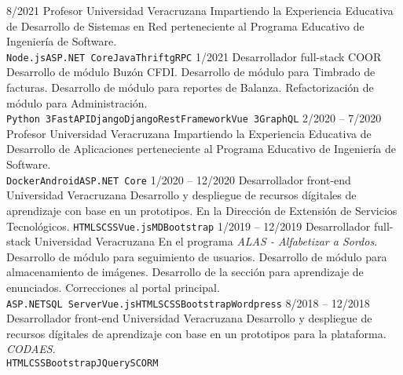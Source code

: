 \documentclass[9pt]{developercv} %
\begin{document}
\begin{entrylist}
	\entry
		{8/2021}
		{Profesor}
		{Universidad Veracruzana}
        {Impartiendo la Experiencia Educativa de Desarrollo de Sistemas en Red perteneciente al Programa Educativo de Ingeniería de Software.\\
        \texttt{Node.js}\slashsep\texttt{ASP.NET Core}\slashsep\texttt{Java}\slashsep\texttt{Thrift}\slashsep\texttt{gRPC}}
	\entry
		{1/2021}
		{Desarrollador full-stack}
		{COOR}
        {Desarrollo de módulo Buzón CFDI. Desarrollo de módulo para Timbrado de facturas. Desarrollo de módulo para reportes de Balanza. Refactorización de módulo para Administración.\\
        \texttt{Python 3}\slashsep\texttt{FastAPI}\slashsep\texttt{Django}\slashsep\texttt{DjangoRestFramework}\slashsep\texttt{Vue 3}\slashsep\texttt{GraphQL}}	
    \entry
		{2/2020 -- 7/2020}
		{Profesor}
		{Universidad Veracruzana}
        {Impartiendo la Experiencia Educativa de Desarrollo de Aplicaciones perteneciente al Programa Educativo de Ingeniería de Software.\\
        \texttt{Docker}\slashsep\texttt{Android}\slashsep\texttt{ASP.NET Core}}
	\entry
		{1/2020 -- 12/2020}
		{Desarrollador front-end}
		{Universidad Veracruzana}
        {Desarrollo y despliegue de recursos dígitales de aprendizaje con base en un prototipos. En la Dirección de Extensión de Servicios Tecnológicos.
        \texttt{HTML}\slashsep\texttt{SCSS}\slashsep\texttt{Vue.js}\slashsep\texttt{MDBootstrap}}
	\entry
		{1/2019 -- 12/2019}
		{Desarrollador full-stack}
		{Universidad Veracruzana}
        {En el programa \textit{ALAS - Alfabetizar a Sordos}. Desarrollo de módulo para seguimiento de usuarios. Desarrollo de módulo para almacenamiento de imágenes. Desarrollo de la sección para aprendizaje de enunciados. Correcciones al portal principal. \\
        \texttt{ASP.NET}\slashsep\texttt{SQL Server}\slashsep\texttt{Vue.js}\slashsep\texttt{HTML}\slashsep\texttt{SCSS}\slashsep\texttt{Bootstrap}\slashsep\texttt{Wordpress}}
	\entry
		{8/2018 -- 12/2018}
		{Desarrollador front-end}
		{Universidad Veracruzana}
        {Desarrollo y despliegue de recursos dígitales de aprendizaje con base en un prototipos para la plataforma. \textit{CODAES}. \\
        \texttt{HTML}\slashsep\texttt{CSS}\slashsep\texttt{Bootstrap}\slashsep\texttt{JQuery}\slashsep\texttt{SCORM}}
\end{entrylist}

\end{document}

